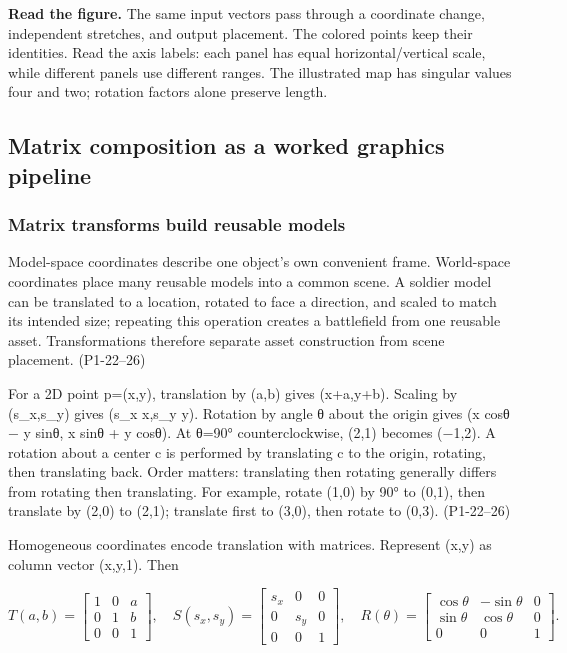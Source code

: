 \textbf{Read the figure.} The same input vectors pass through a coordinate change, independent stretches, and output placement. The colored points keep their identities. Read the axis labels: each panel has equal horizontal/vertical scale, while different panels use different ranges. The illustrated map has singular values four and two; rotation factors alone preserve length.

\subsection{Matrix composition as a worked graphics pipeline}\label{03-visual-computing-i-ch001-matrix-composition-as-a-worked-graphics-pipeline}

\subsubsection{Matrix transforms build reusable models}\label{03-visual-computing-i-ch001-matrix-transforms-build-reusable-models}

Model-space coordinates describe one object's own convenient frame. World-space coordinates place many reusable models into a common scene. A soldier model can be translated to a location, rotated to face a direction, and scaled to match its intended size; repeating this operation creates a battlefield from one reusable asset. Transformations therefore separate asset construction from scene placement. (P1-22--26)

For a 2D point p=(x,y), translation by (a,b) gives (x+a,y+b). Scaling by (s\_x,s\_y) gives (s\_x x,s\_y y). Rotation by angle θ about the origin gives (x cosθ − y sinθ, x sinθ + y cosθ). At θ=90° counterclockwise, (2,1) becomes (−1,2). A rotation about a center c is performed by translating c to the origin, rotating, then translating back. Order matters: translating then rotating generally differs from rotating then translating. For example, rotate (1,0) by 90° to (0,1), then translate by (2,0) to (2,1); translate first to (3,0), then rotate to (0,3). (P1-22--26)

Homogeneous coordinates encode translation with matrices. Represent (x,y) as column vector (x,y,1). Then

\[
T(a,b)=\begin{bmatrix}1&0&a\\0&1&b\\0&0&1\end{bmatrix},\quad
S(s_x,s_y)=\begin{bmatrix}s_x&0&0\\0&s_y&0\\0&0&1\end{bmatrix},\quad
R(\theta)=\begin{bmatrix}\cos\theta&-\sin\theta&0\\\sin\theta&\cos\theta&0\\0&0&1\end{bmatrix}.
\]

